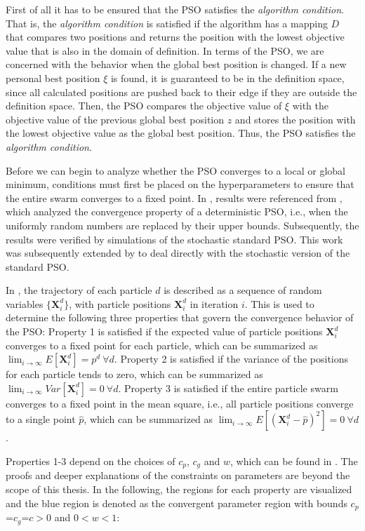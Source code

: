 \documentclass[
  oneside, a4paper, 12pt, openany]{book}
\theoremstyle{definition}
\theoremstyle{definition}
\theoremstyle{definition}
\theoremstyle{definition}
\theoremstyle{remark}
\begin{document}
First of all it has to be ensured that the PSO satisfies the \emph{algorithm condition}. That is, the \emph{algorithm condition} is satisfied if the algorithm has a mapping \(D\) that compares two positions and returns the position with the lowest objective value that is also in the domain of definition. In terms of the PSO, we are concerned with the behavior when the global best position is changed. If a new personal best position \(\xi\) is found, it is guaranteed to be in the definition space, since all calculated positions are pushed back to their edge if they are outside the definition space. Then, the PSO compares the objective value of \(\xi\) with the objective value of the previous global best position \(z\) and stores the position with the lowest objective value as the global best position. Thus, the PSO satisfies the \emph{algorithm condition}.

Before we can begin to analyze whether the PSO converges to a local or global minimum, conditions must first be placed on the hyperparameters to ensure that the entire swarm converges to a fixed point. In \citep{FbEn2010}, results were referenced from \citep{RiPo2007}, which analyzed the convergence property of a deterministic PSO, i.e., when the uniformly random numbers are replaced by their upper bounds. Subsequently, the results were verified by simulations of the stochastic standard PSO. This work was subsequently extended by \citep{Mjly2006} to deal directly with the stochastic version of the standard PSO.

In \citep{Mjly2006}, the trajectory of each particle \(d\) is described as a sequence of random variables \(\{\pmb{X}^d_i\}\), with particle positions \(\pmb{X}^d_i\) in iteration \(i\). This is used to determine the following three properties that govern the convergence behavior of the PSO: Property 1 is satisfied if the expected value of particle positions \(\pmb{X}^d_i\) converges to a fixed point for each particle, which can be summarized as \(\lim_{i\rightarrow \infty} E[\pmb{X}^d_i] = p^d \ \forall d\). Property 2 is satisfied if the variance of the positions for each particle tends to zero, which can be summarized as \(\lim_{i\rightarrow \infty} Var[\pmb{X}^d_i] = 0 \ \forall d\). Property 3 is satisfied if the entire particle swarm converges to a fixed point in the mean square, i.e., all particle positions converge to a single point \(\hat{p}\), which can be summarized as \(\lim_{i\rightarrow \infty} E[(\pmb{X}_i^d-\hat{p})^2]=0 \ \forall d\).

Properties 1-3 depend on the choices of \(c_p\), \(c_g\) and \(w\), which can be found in \citep{Mjly2006}. The proofs and deeper explanations of the constraints on parameters are beyond the scope of this thesis. In the following, the regions for each property are visualized and the blue region is denoted as the convergent parameter region with bounds \(c_p\)=\(c_g\)=\(c>0\) and \(0<w<1\):
\end{document}
